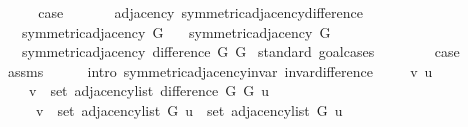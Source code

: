 \begin{isabellebody}
\ \ \isamarkupfalse%
\ \isamarkupfalse%
\ {\isacharquery}{\kern0pt}case\isanewline
\ \ \ \ \isacommand{{\isachardot}{\kern0pt}}\isamarkupfalse%
\isanewline
{}\isamarkupfalse%
%
\endisatagproof
{\isafoldproof}%
%
\isadelimproof
\isanewline
%
\endisadelimproof
\isanewline
{}\isamarkupfalse%
\ {\isacharparenleft}{\kern0pt}\ adjacency{\isacharparenright}{\kern0pt}\ symmetric{\isacharunderscore}{\kern0pt}adjacency{\isacharunderscore}{\kern0pt}difference{\isacharcolon}{\kern0pt}\isanewline
\ \ \ {\isachardoublequoteopen}symmetric{\isacharunderscore}{\kern0pt}adjacency{\isacharprime}{\kern0pt}\ G{}{\isachardoublequoteclose}\isanewline
\ \ \ {\isachardoublequoteopen}symmetric{\isacharunderscore}{\kern0pt}adjacency{\isacharprime}{\kern0pt}\ G{}{\isachardoublequoteclose}\isanewline
\ \ \ {\isachardoublequoteopen}symmetric{\isacharunderscore}{\kern0pt}adjacency{\isacharprime}{\kern0pt}\ {\isacharparenleft}{\kern0pt}difference\ G{}\ G{}{\isacharparenright}{\kern0pt}{\isachardoublequoteclose}\isanewline
%
\isadelimproof
%
\endisadelimproof
%
\isatagproof
{}\isamarkupfalse%
\ {\isacharparenleft}{\kern0pt}standard{\isacharcomma}{\kern0pt}\ goal{\isacharunderscore}{\kern0pt}cases{\isacharparenright}{\kern0pt}\isanewline
\ \ \isamarkupfalse%
\ {}\isanewline
\ \ \isamarkupfalse%
\ {\isacharquery}{\kern0pt}case\isanewline
\ \ \ \ \isamarkupfalse%
\ assms\isanewline
\ \ \ \ \isamarkupfalse%
\ {\isacharparenleft}{\kern0pt}intro\ symmetric{\isacharunderscore}{\kern0pt}adjacency{\isachardot}{\kern0pt}invar\ invar{\isacharunderscore}{\kern0pt}difference{\isacharparenright}{\kern0pt}\isanewline
{}\isamarkupfalse%
\isanewline
\ \ \isamarkupfalse%
\ {\isacharparenleft}{\kern0pt}{}\ v\ u{\isacharparenright}{\kern0pt}\isanewline
\ \ \isamarkupfalse%
\isanewline
\ \ \ \ {\isachardoublequoteopen}v\ {\isasymin}\ set\ {\isacharparenleft}{\kern0pt}adjacency{\isacharunderscore}{\kern0pt}list\ {\isacharparenleft}{\kern0pt}difference\ G{}\ G{}{\isacharparenright}{\kern0pt}\ u{\isacharparenright}{\kern0pt}\ {\isasymlongleftrightarrow}\isanewline
\ \ \ \ \ v\ {\isasymin}\ set\ {\isacharparenleft}{\kern0pt}adjacency{\isacharunderscore}{\kern0pt}list\ G{}\ u{\isacharparenright}{\kern0pt}\ {\isacharminus}{\kern0pt}\ set\ {\isacharparenleft}{\kern0pt}adjacency{\isacharunderscore}{\kern0pt}list\ G{}\ u{\isacharparenright}{\kern0pt}{\isachardoublequoteclose}\isanewline

\end{isabellebody}

